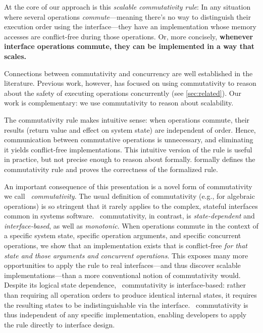 At the core of our approach is this \emph{scalable commutativity rule}: In any
situation where several operations \emph{commute}---meaning
there's no way to distinguish their execution order using the
interface---they have an implementation whose memory accesses
are conflict-free during those operations.
Or, more concisely,
\textbf{whenever interface operations commute, they can be implemented in a way
  that scales.}

Connections between commutativity and concurrency are well
established in the literature.  Previous work, however, has focused on
using commutativity to reason about the safety of executing operations
concurrently (see \cref{sec:related}).  Our work is complementary: we
use commutativity to reason about scalability.


The commutativity rule makes
intuitive sense: when operations commute, their
results (return value and effect on system state) are independent of order.
Hence, communication between commutative operations is
unnecessary, and eliminating it yields conflict-free implementations.
%
This intuitive version of the rule is useful in practice, but
not precise enough to reason
about formally.
%
 formally defines the commutativity rule and proves
the correctness of the formalized rule.

An important consequence of this presentation is a novel form of
commutativity we call \emph{\SIM\ commutativity}.
%
The usual definition of commutativity (e.g., for algebraic operations)
is so stringent that it rarely applies to the complex, stateful
interfaces common in systems software.
%
\SIM\ commutativity, in contrast, is \emph{state-dependent} and
\emph{interface-based}, as well as \emph{monotonic}.
%
When operations commute in the context of a specific system state,
specific operation arguments, and specific concurrent operations, we
show that an implementation exists that is conflict-free \emph{for that state
  and those arguments and concurrent operations}.
%
This exposes many more opportunities to apply the rule to real
interfaces---and thus discover scalable implementations---than a more
conventional notion of commutativity would.
%
Despite its logical state dependence, \SIM\ commutativity is
interface-based: rather than requiring all operation orders to produce
identical internal states, it requires the resulting states to be
indistinguishable via the interface.
%
\SIM\ commutativity is thus independent of any specific
implementation, enabling developers to apply the rule directly to
interface design.

